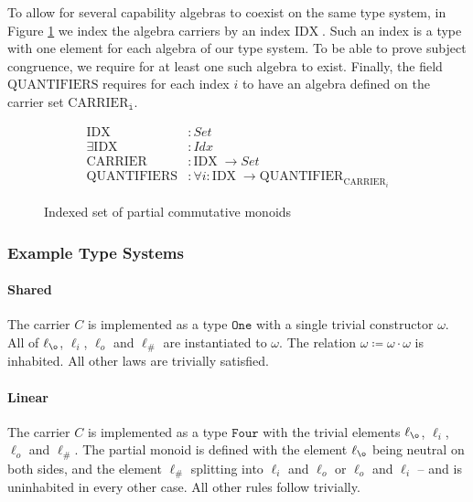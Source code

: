 \documentclass[a4paper,UKenglish,cleveref, autoref, thm-restate,authorcolumns]{lipics-v2019}
\newcommand{\op}[3]{#1 \coloneqq #2 \cdot #3}
\newcommand{\Idx}{\mathrm{IDX}\;}
\newcommand{\Carrier}{\mathrm{CARRIER}}
\newcommand{\Quantifier}{\mathrm{QUANTIFIER}}
\newcommand{\Quantifiers}{\mathrm{QUANTIFIERS}}
\newcommand{\constr}[1]{\mathtt{#1}}
\begin{document}
To allow for several capability algebras to coexist on the same type system, in Figure \ref{indexed-capabilities} we index the algebra carriers by an index $\Idx$.
Such an index is a type with one element for each algebra of our type system.
To be able to prove subject congruence, we require for at least one such algebra to exist.
Finally, the field $\constr{\Quantifiers}$ requires for each index $i$ to have an algebra defined on the carrier set $\constr{\Carrier_i}$.

\begin{figure}[h]
\begin{equation}
\begin{split}
  \constr{\Idx}          &: Set \\
  \constr{\exists \Idx}  &: Idx \\
  \constr{\Carrier}      &: \Idx \to Set \\
  \constr{\Quantifiers}  &: \forall i : \Idx \to \Quantifier_{\Carrier_i}
\end{split}
\end{equation}
\caption{Indexed set of partial commutative monoids}
\label{indexed-capabilities}
\end{figure}

\subsubsection{Example Type Systems}

\paragraph{Shared}

The carrier $C$ is implemented as a type $\constr{One}$ with a single trivial constructor $\omega$.
All of $\ell_{\o}$, $\ell_i$, $\ell_o$ and $\ell_\#$ are instantiated to $\omega$.
The relation $\op{\omega}{\omega}{\omega}$ is inhabited.
All other laws are trivially satisfied.

\paragraph{Linear}

The carrier $C$ is implemented as a type $\constr{Four}$ with the trivial elements $\ell_{\o}$, $\ell_i$, $\ell_o$ and $\ell_\#$.
The partial monoid is defined with the element $\ell_{\o}$ being neutral on both sides, and the element $\ell_\#$ splitting into $\ell_i$ and $\ell_o$ or $\ell_o$ and $\ell_i$ -- and is uninhabited in every other case.
All other rules follow trivially.
\end{document}
